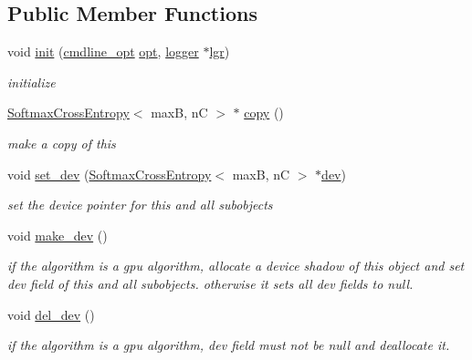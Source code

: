 \subsection*{Public Member Functions}
\begin{DoxyCompactItemize}
\item 
void \hyperlink{structSoftmaxCrossEntropy_ad531aa32fa665c1596f686eae4b8e008}{init} (\hyperlink{structcmdline__opt}{cmdline\+\_\+opt} \hyperlink{structSoftmaxCrossEntropy_a5b1fcafb5b11b7c6c09c228fb442a888}{opt}, \hyperlink{structlogger}{logger} $\ast$\hyperlink{structSoftmaxCrossEntropy_a10a76ce6a1cd3e1d1a57c0f2ba42f5a0}{lgr})
\begin{DoxyCompactList}\small\item\em initialize \end{DoxyCompactList}\item 
\hyperlink{structSoftmaxCrossEntropy}{Softmax\+Cross\+Entropy}$<$ maxB, nC $>$ $\ast$ \hyperlink{structSoftmaxCrossEntropy_aa152e1e400520acefcaa8bfa0999fce7}{copy} ()
\begin{DoxyCompactList}\small\item\em make a copy of this \end{DoxyCompactList}\item 
void \hyperlink{structSoftmaxCrossEntropy_a2fd71f3001bb7a06f4f4c2902c43b657}{set\+\_\+dev} (\hyperlink{structSoftmaxCrossEntropy}{Softmax\+Cross\+Entropy}$<$ maxB, nC $>$ $\ast$\hyperlink{structSoftmaxCrossEntropy_a5a1e252b71ec4a89577e908abe7e723e}{dev})
\begin{DoxyCompactList}\small\item\em set the device pointer for this and all subobjects \end{DoxyCompactList}\item 
void \hyperlink{structSoftmaxCrossEntropy_ae02a6267c117629143f37216cad345a0}{make\+\_\+dev} ()
\begin{DoxyCompactList}\small\item\em if the algorithm is a gpu algorithm, allocate a device shadow of this object and set dev field of this and all subobjects. otherwise it sets all dev fields to null. \end{DoxyCompactList}\item 
void \hyperlink{structSoftmaxCrossEntropy_acbef8ab0f759568a85decdcfd4a5353c}{del\+\_\+dev} ()
\begin{DoxyCompactList}\small\item\em if the algorithm is a gpu algorithm, dev field must not be null and deallocate it. \end{DoxyCompactList}\item 

\end{DoxyCompactItemize}
